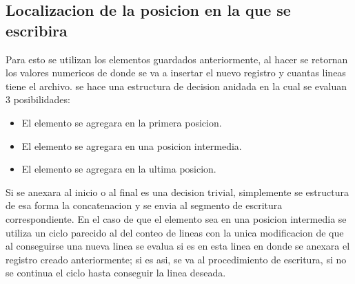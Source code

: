 \subsection*{Localizacion de la posicion en la que se escribira}

    Para esto se utilizan los elementos guardados anteriormente, al hacer
     se retornan los valores numericos de donde se va a insertar
    el nuevo registro y cuantas lineas tiene el archivo. se hace una estructura
    de decision anidada en la cual se evaluan 3 posibilidades:

    \begin{itemize}
        \item El elemento se agregara en la primera posicion.
        \item El elemento se agregara en una posicion intermedia.
        \item El elemento se agregara en la ultima posicion.
    \end{itemize}

    Si se anexara al inicio o al final es una decision trivial, simplemente se
    estructura de esa forma la concatenacion y se envia al segmento de escritura
    correspondiente. En el caso de que el elemento sea
    en una posicion intermedia se utiliza un ciclo parecido al del conteo de lineas
    con la unica modificacion de que al conseguirse una nueva linea se evalua si
    es en esta linea en donde se anexara el registro creado anteriormente; si es
    asi, se va al procedimiento de escritura, si no se continua el ciclo hasta
    conseguir la linea deseada.

